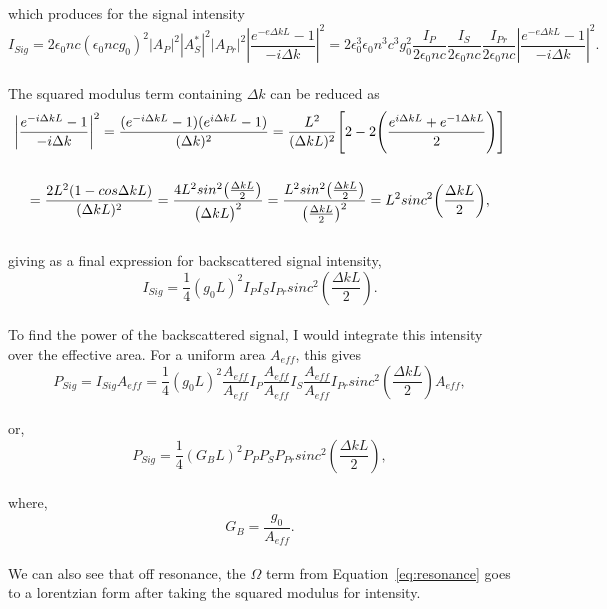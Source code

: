 which produces for the signal intensity
\\
\begin{equation}
  I_{Sig} = 2\epsilon_{0}nc(\epsilon_{0}ncg_{0})^{2}|A_{P}|^{2}|A_{S}^{*}|^{2}|A_{Pr}|^{2}\left|\frac{e^{-e\Delta kL} - 1}{-i\Delta k}\right|^{2}
  = 2\epsilon_{0}^{3}\epsilon_{0}n^{3}c^{3}g_{0}^{2}\frac{I_{P}}{2\epsilon_{0}nc}\frac{I_{S}}{2\epsilon_{0}nc}\frac{I_{Pr}}{2\epsilon_{0}nc}\left|\frac{e^{-e\Delta kL} - 1}{-i\Delta k}\right|^{2}.
\end{equation}
\\
The squared modulus term containing \(\Delta k\) can be reduced as
\\
\begin{gather}
  \bigg|\frac{e^{-i\Delta kL} - 1}{-i\Delta k}\bigg|^{2} = \frac{(e^{-i\Delta kL} - 1)(e^{i\Delta kL} - 1)}{(\Delta k)^{2}} = \frac{L^{2}}{(\Delta kL)^{2}}\Bigg[ 2 - 2\Bigg(\frac{e^{i\Delta kL} + e^{-1\Delta kL}}{2}\Bigg)\Bigg] \notag \\ \notag \\
  = \frac{2L^{2}(1 - cos\Delta kL)}{(\Delta kL)^{2}} = \frac{4L^{2}sin^{2}\big(\frac{\Delta kL}{2}\big)}{\big(\Delta kL\big)^{2}} = \frac{L^{2}sin^{2}\big(\frac{\Delta kL}{2}\big)}{\big(\frac{\Delta kL}{2}\big)^{2}} = L^{2}sinc^{2}\bigg(\frac{\Delta kL}{2}\bigg),
\end{gather}
\\
giving as a final expression for backscattered signal intensity,
\\
\begin{equation}
I_{Sig} = \frac{1}{4}(g_{0}L)^{2}I_{P}I_{S}I_{Pr}sinc^{2}\left(\frac{\Delta kL}{2}\right).
\end{equation}
\\

To find the power of the backscattered signal, I would integrate this intensity over the effective area. For a uniform area \(A_{eff}\), this gives
\\
\begin{equation}
  P_{Sig} = I_{Sig}A_{eff} = \frac{1}{4}(g_{0}L)^{2}\frac{A_{eff}}{A_{eff}}I_{P}\frac{A_{eff}}{A_{eff}}I_{S}\frac{A_{eff}}{A_{eff}}I_{Pr}sinc^{2}\left(\frac{\Delta kL}{2}\right)A_{eff},
\end{equation}
\\
or,
\\
\begin{equation}
  P_{Sig} = \frac{1}{4}(G_{B}L)^{2}P_{P}P_{S}P_{Pr}sinc^{2}\left(\frac{\Delta kL}{2}\right),
\end{equation}
\\
where,
\\
\begin{equation}
  G_{B} = \frac{g_{0}}{A_{eff}}.
\end{equation}
\\
We can also see that off resonance, the \(\Omega\) term from Equation~\ref{eq:resonance} goes to a lorentzian form after taking the squared modulus for intensity.

